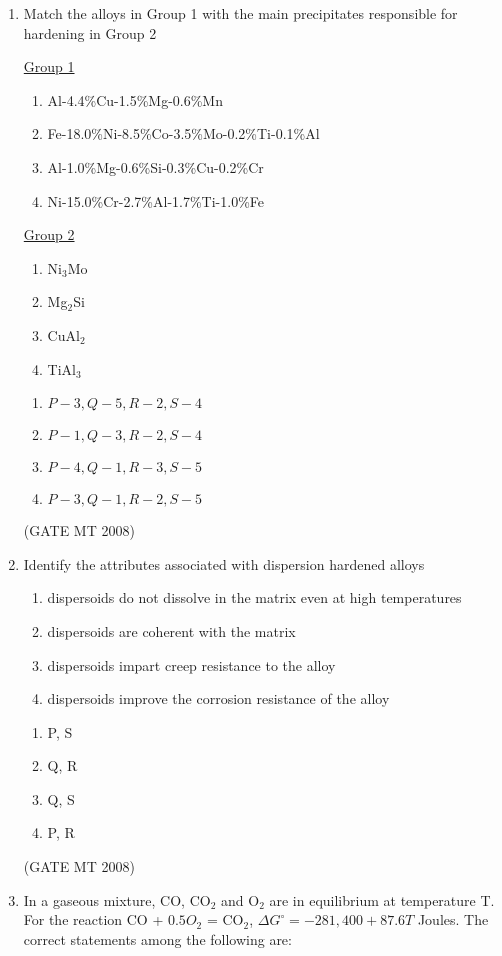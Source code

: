 \documentclass[11pt, letterpaper]{article}
\theoremstyle{remark}
\begin{document}
\begin{enumerate}
\item Match the alloys in Group 1 with the main precipitates responsible for hardening in Group 2
\begin{multicols}{2}
\underline{Group 1}
\begin{enumerate}[label=(\Alph*), start=16]
\item Al-4.4\%Cu-1.5\%Mg-0.6\%Mn
\item Fe-18.0\%Ni-8.5\%Co-3.5\%Mo-0.2\%Ti-0.1\%Al
\item Al-1.0\%Mg-0.6\%Si-0.3\%Cu-0.2\%Cr
\item Ni-15.0\%Cr-2.7\%Al-1.7\%Ti-1.0\%Fe
\end{enumerate}

\underline{Group 2}
\begin{enumerate}[label=(\arabic*), start=1]
\item Ni$_3$Mo
\item Mg$_2$Si
\item CuAl$_2$ 
\item TiAl$_3$
\end{enumerate}
\end{multicols}

\begin{multicols}{2}
\begin{enumerate} 
\item $P-3, Q-5, R-2, S-4$
\item $P-1, Q-3, R-2, S-4$
\item $P-4, Q-1, R-3, S-5$
\item $P-3, Q-1, R-2, S-5$
\end{enumerate}
\end{multicols}

\hfill(GATE MT 2008)
\item Identify the attributes associated with dispersion hardened alloys
\begin{enumerate}[label=(\MakeUppercase{\alph*}), start= 16]
\item dispersoids do not dissolve in the matrix even at high temperatures
\item dispersoids are coherent with the matrix
\item dispersoids impart creep resistance to the alloy
\item dispersoids improve the corrosion resistance of the alloy
\end{enumerate}
\begin{multicols}{2}
\begin{enumerate} 
\item P, S
\item Q, R
\item Q, S
\item P, R
\end{enumerate}
\end{multicols}
\hfill(GATE MT 2008)
\item In a gaseous mixture, CO, CO$_2$ and O$_2$ are in equilibrium at temperature T. 
For the reaction CO + $0.5O$$_2$ = CO$_2$, 
$\Delta G^\circ = -281,400 + 87.6T$ Joules. 
The correct statements among the following are:


\end{enumerate}
\end{document}
